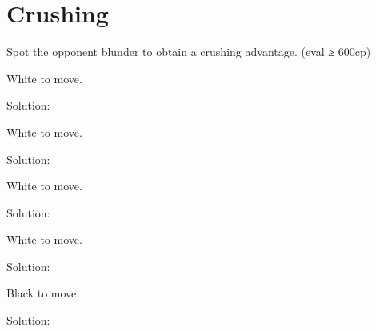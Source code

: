 \documentclass{book}
\begin{document}
\section{Crushing}
Spot the opponent blunder to obtain a crushing advantage. (eval ≥ 600cp)\begin{multicols}{2} 
\begin{samepage} 
\newgame 


 
\showboard
 
 White to move. 
 
Solution: 
 
\end{samepage}\begin{samepage} 
\newgame 


 
\showboard
 
 White to move. 
 
Solution: 
 
\end{samepage}\begin{samepage} 
\newgame 


 
\showboard
 
 White to move. 
 
Solution: 
 
\end{samepage}\begin{samepage} 
\newgame 


 
\showboard
 
 White to move. 
 
Solution: 
 
\end{samepage}\begin{samepage} 
\newgame 


 
\showboard
 
 Black to move. 
 
Solution: 
 
\end{samepage}\begin{samepage} 
\newgame 


\end{samepage}
\end{multicols}
\end{document}
